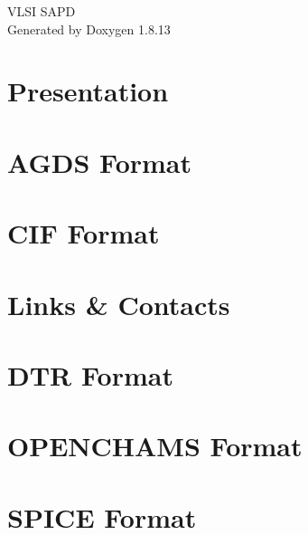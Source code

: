 \documentclass[twoside]{book}
\newcommand{\+}{\discretionary{\mbox{\scriptsize$\hookleftarrow$}}{}{}}
\newcommand{\clearemptydoublepage}{%
  \newpage{\pagestyle{empty}\cleardoublepage}%
}
\begin{document}
\hypersetup{pageanchor=false,
             bookmarksnumbered=true,
             pdfencoding=unicode
            }
\begin{titlepage}
\vspace*{7cm}
\begin{center}%
{\Large V\+L\+SI S\+A\+PD }\\
\vspace*{1cm}
{\large Generated by Doxygen 1.8.13}\\
\end{center}
\end{titlepage}
\clearemptydoublepage
{}
\tableofcontents
\clearemptydoublepage
{}
\hypersetup{pageanchor=true}

\chapter{Presentation}
\label{index}\hypertarget{index}{}
\chapter{A\+G\+DS Format}
\label{agds}

\chapter{C\+IF Format}
\label{cif}

\chapter{Links \& Contacts}
\label{contact}

\chapter{D\+TR Format}
\label{dtr}

\chapter{O\+P\+E\+N\+C\+H\+A\+MS Format}
\label{openchams}

\chapter{S\+P\+I\+CE Format}
\label{spice}

\end{document}
